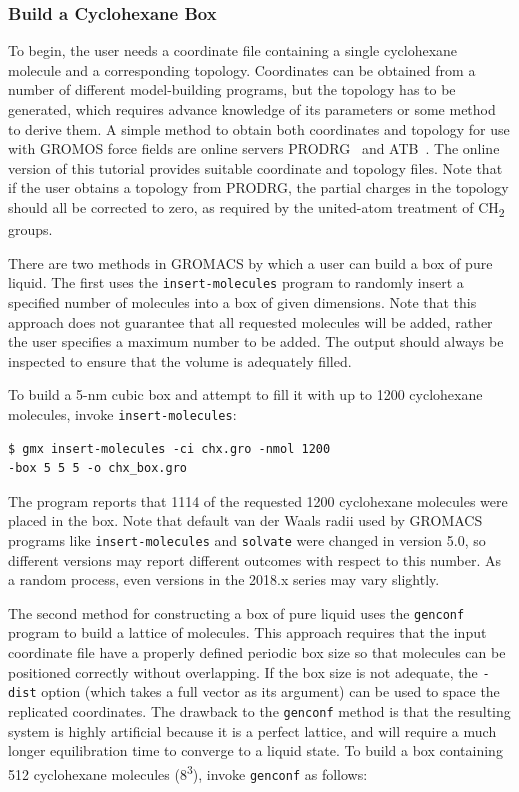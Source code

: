 \documentclass[9pt,tutorial]{livecoms}
\begin{document}
\subsubsection{Build a Cyclohexane Box} \label{biphasic_chx_box}

To begin, the user needs a coordinate file containing a single cyclohexane molecule and a corresponding topology. Coordinates can be obtained from a number of different model-building programs, but the topology has to be generated, which requires advance knowledge of its parameters or some method to derive them. A simple method to obtain both coordinates and topology for use with GROMOS force fields are online servers PRODRG~\cite{vanAalten1996} and ATB~\cite{Malde2011}. The online version of this tutorial provides suitable coordinate and topology files. Note that if the user obtains a topology from PRODRG, the partial charges in the topology should all be corrected to zero, as required by the united-atom treatment of CH\textsubscript{2} groups.

There are two methods in GROMACS by which a user can build a box of pure liquid. The first uses the \texttt{insert-molecules} program to randomly insert a specified number of molecules into a box of given dimensions. Note that this approach does not guarantee that all requested molecules will be added, rather the user specifies a maximum number to be added. The output should always be inspected to ensure that the volume is adequately filled.

To build a 5-nm cubic box and attempt to fill it with up to 1200 cyclohexane molecules, invoke \texttt{insert-molecules}:

\begin{verbatim}
$ gmx insert-molecules -ci chx.gro -nmol 1200
-box 5 5 5 -o chx_box.gro
\end{verbatim}

The program reports that 1114 of the requested 1200 cyclohexane molecules were placed in the box. Note that default van der Waals radii used by GROMACS programs like \texttt{insert-molecules} and \texttt{solvate} were changed in version 5.0, so different versions may report different outcomes with respect to this number. As a random process, even versions in the 2018.x series may vary slightly.

The second method for constructing a box of pure liquid uses the \texttt{genconf} program to build a lattice of molecules. This approach requires that the input coordinate file have a properly defined periodic box size so that molecules can be positioned correctly without overlapping. If the box size is not adequate, the \texttt{-dist} option (which takes a full vector as its argument) can be used to space the replicated coordinates. The drawback to the \texttt{genconf} method is that the resulting system is highly artificial because it is a perfect lattice, and will require a much longer equilibration time to converge to a liquid state. To build a box containing 512 cyclohexane molecules (8\textsuperscript{3}), invoke \texttt{genconf} as follows:
\end{document}
